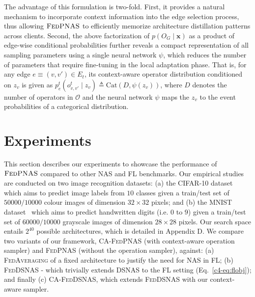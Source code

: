 The advantage of this formulation is two-fold. First, it provides a natural mechanism to incorporate context information into the edge selection process, thus allowing $\textsc{FedPNAS}$ to efficiently memorize architecture distillation patterns across clients. Second, the above factorization of $p(O_G \mid \mathbf {x})$ as a product of edge-wise conditional probabilities further reveals a compact representation of all sampling parameters using a single neural network $\psi$, which reduces the number of parameters that require fine-tuning in the local adaptation phase. That is, for any edge $e \equiv (v, v') \in E_t$, its context-aware operator distribution conditioned on $z_v$ is given as $p^t_e(o^t_{v,v'} \mid z_{v}) \triangleq \mathrm{Cat}\left(D, \psi\left(z_{v}\right)\right)$, where $D$ denotes the number of operators in $\mathcal{O}$ and the neural network $\psi$ maps the $z_{v}$ to the event probabilities of a categorical distribution.

\section{Experiments}
\label{c4-sec:exp}
This section describes our experiments to showcase the performance of $\textsc{FedPNAS}$ compared to other NAS and FL benchmarks. Our empirical studies are conducted on two image recognition datasets: (a) the CIFAR-10 dataset~\citep{cifar10} which aims to predict image labels from $10$ classes given a train/test set of $50000/10000$ colour images of dimension $32 \times 32$ pixels; and (b) the MNIST dataset~\citep{lecun2010mnist} which aims to predict handwritten digits (i.e. $0$ to $9$) given a train/test set of $60000/10000$ grayscale images of dimension $28 \times 28$ pixels. Our search space entails $2^{40}$ possible architectures, which is detailed in Appendix D. We compare two variants of our framework, \textsc{CA-FedPNAS} (with context-aware operation sampler) and \textsc{FedPNAS} (without the operation sampler), against:
(a) \textsc{FedAveraging} of a fixed architecture to justify the need for NAS in FL; (b) \textsc{FedDSNAS} - which trivially extends DSNAS to the FL setting (Eq.~\eqref{c4-eq:flobj}); and finally (c) \textsc{CA-FedDSNAS}, which extends \textsc{FedDSNAS} with our context-aware sampler.

